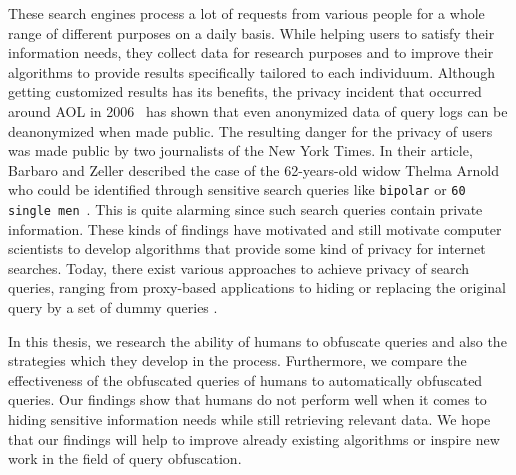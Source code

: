 These search engines process a lot of requests from various people for a whole range of different purposes on a daily basis. While helping users to satisfy their information needs, they collect data for research purposes and to improve their algorithms to provide results specifically tailored to each individuum. Although getting customized results has its benefits, the privacy incident that occurred around AOL in 2006~\cite{aol} has shown that even anonymized data of query logs can be deanonymized when made public. The resulting danger for the privacy of users was made public by two journalists of the New York Times. In their article, Barbaro and Zeller described the case of the 62-years-old widow Thelma Arnold who could be identified through sensitive search queries like \texttt{bipolar} or \texttt{60 single men}~\cite{aol}. This is quite alarming since such search queries contain private information. These kinds of findings have motivated and still motivate computer scientists to develop algorithms that provide some kind of privacy for internet searches. Today, there exist various approaches to achieve privacy of search queries, ranging from proxy-based \cite{privateWebSearch} applications to hiding or replacing the original query by a set of dummy queries \cite{arampatzis, plausiblyDeniableSearch, trackmenot1}.\par
In this thesis, we research the ability of humans to obfuscate queries and also the strategies which they develop in the process. Furthermore, we compare the effectiveness of the obfuscated queries of humans to automatically obfuscated queries. Our findings show that humans do not perform well when it comes to hiding sensitive information needs while still retrieving relevant data.
We hope that our findings will help to improve already existing algorithms or inspire new work in the field of query obfuscation.